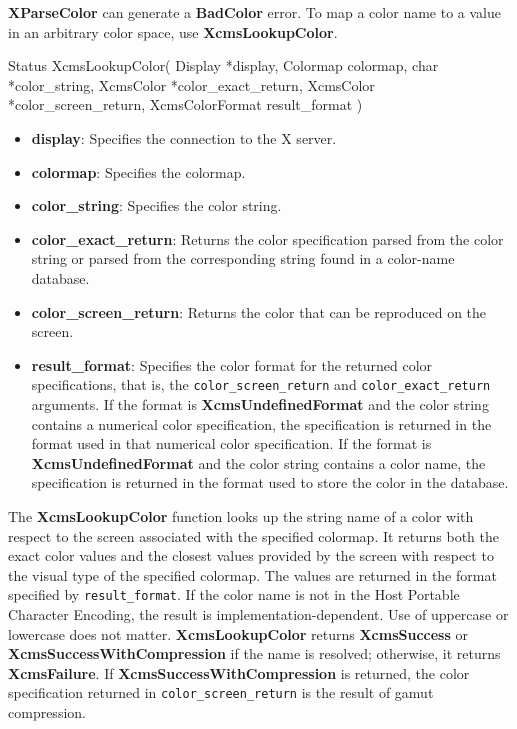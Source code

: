 \documentclass{report}
\begin{document}
\begin{itemize}
            \bigbreak \noindent
            \textbf{XParseColor} can generate a \textbf{BadColor} error.
            \bigbreak \noindent
            To map a color name to a value in an arbitrary color space, use \textbf{XcmsLookupColor}.
            \bigbreak \noindent
            \begin{cppcode}
                Status XcmsLookupColor(
                    Display *display,
                    Colormap colormap,
                    char *color_string,
                    XcmsColor *color_exact_return,
                    XcmsColor *color_screen_return,
                    XcmsColorFormat result_format
                )
            \end{cppcode}
            \begin{itemize}
                \item \textbf{display}: Specifies the connection to the X server.
                \item \textbf{colormap}: Specifies the colormap.
                \item \textbf{color\_string}: Specifies the color string.
                \item \textbf{color\_exact\_return}: Returns the color specification parsed from the color string or parsed from the corresponding string found in a color-name database.
                \item \textbf{color\_screen\_return}: Returns the color that can be reproduced on the screen.
                \item \textbf{result\_format}: Specifies the color format for the returned color specifications, that is, the \texttt{color\_screen\_return} and \texttt{color\_exact\_return} arguments. If the format is \textbf{XcmsUndefinedFormat} and the color string contains a numerical color specification, the specification is returned in the format used in that numerical color specification. If the format is \textbf{XcmsUndefinedFormat} and the color string contains a color name, the specification is returned in the format used to store the color in the database.
            \end{itemize}
            \bigbreak \noindent
            The \textbf{XcmsLookupColor} function looks up the string name of a color with respect to the screen associated with the specified colormap. It returns both the exact color values and the closest values provided by the screen with respect to the visual type of the specified colormap. The values are returned in the format specified by \texttt{result\_format}. If the color name is not in the Host Portable Character Encoding, the result is implementation-dependent. Use of uppercase or lowercase does not matter. \textbf{XcmsLookupColor} returns \textbf{XcmsSuccess} or \textbf{XcmsSuccessWithCompression} if the name is resolved; otherwise, it returns \textbf{XcmsFailure}. If \textbf{XcmsSuccessWithCompression} is returned, the color specification returned in \texttt{color\_screen\_return} is the result of gamut compression.

\end{itemize}
\end{document}
